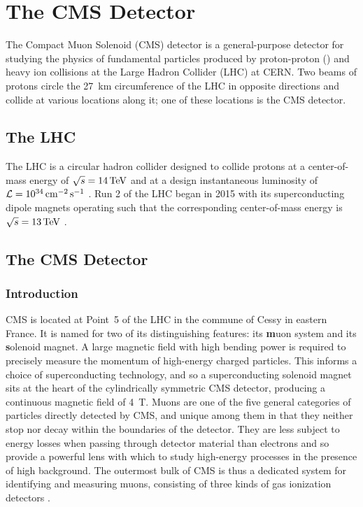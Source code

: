 \chapter{The CMS Detector}

The Compact Muon Solenoid (CMS) detector is a general-purpose detector for studying the physics of fundamental particles produced by proton-proton (\pp) and heavy ion collisions at the Large Hadron Collider (LHC) at CERN.
Two beams of protons circle the 27~km circumference of the LHC in opposite directions and collide at various locations along it; one of these locations is the CMS detector.

\section{The LHC}
The LHC is a circular hadron collider designed to collide protons at a center-of-mass energy of $\sqrt{s} = 14\,\text{Te\hspace{-.08em}V}$ and at a design instantaneous luminosity of $\mathcal{L} = 10^{34} \,\text{cm}^{-2} \text{\,s}^{-1}$ \cite{Evans:2008zzb}.
Run 2 of the LHC began in 2015 with its superconducting dipole magnets operating such that the corresponding center-of-mass energy is $\sqrt{s} = 13\,\text{Te\hspace{-.08em}V}$ \cite{Todesco:2017tcj}.

\section{The CMS Detector}
\subsection{Introduction}
CMS is located at Point~5 of the LHC in the commune of Cessy in eastern France.
It is named for two of its distinguishing features: its \textbf{m}uon system and its \textbf{s}olenoid magnet.
A large magnetic field with high bending power is required to precisely measure the momentum of high-energy charged particles.
This informs a choice of superconducting technology, and so a superconducting solenoid magnet sits at the heart of the cylindrically symmetric CMS detector, producing a continuous magnetic field of 4~T.
Muons are one of the five general categories of particles directly detected by CMS, and unique among them in that they neither stop nor decay within the boundaries of the detector.
They are less subject to energy losses when passing through detector material than electrons and so provide a powerful lens with which to study high-energy processes in the presence of high background.
The outermost bulk of CMS is thus a dedicated system for identifying and measuring muons, consisting of three kinds of gas ionization detectors \cite{Chatrchyan:2008zzk}.

